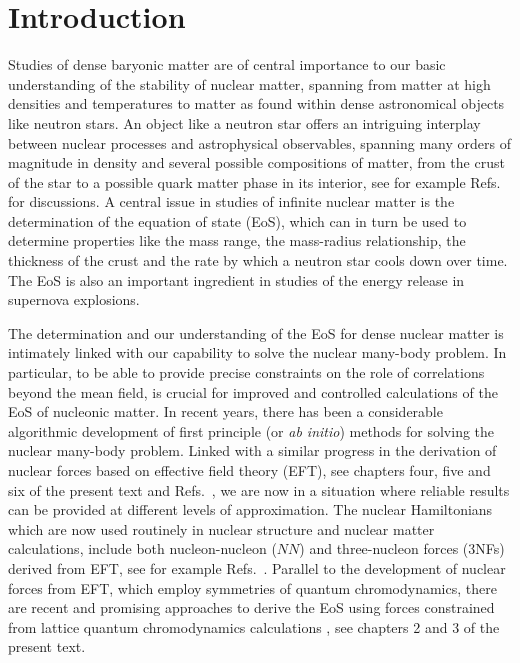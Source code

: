 \section{Introduction}\label{sec:chap8intro}


Studies of dense baryonic matter are of central importance to our
basic understanding of the stability of nuclear matter, spanning from
matter at high densities and temperatures to matter as found within
dense astronomical objects like neutron stars.  An object like a
neutron star offers an intriguing interplay between nuclear processes
and astrophysical observables, spanning many orders of magnitude in
density and several possible compositions of matter, from the crust of
the star to a possible quark matter phase in its interior, see for
example Refs.~\cite{shapiro,prakash2001,Lattimer2007,steiner2010,steiner2012,lattimer2012,weber1999,hh2000}
for discussions.  A central issue in studies of infinite nuclear
matter is the determination of the equation of state (EoS), which can
in turn be used to determine properties like the mass range, the
mass-radius relationship, the thickness of the crust and the rate by
which a neutron star cools down over time. The EoS is also an
important ingredient in studies of the energy release in supernova
explosions.

The determination and our understanding of the EoS for dense nuclear
matter is intimately linked with our capability to solve the nuclear
many-body problem. In particular, to be able to provide precise
constraints on the role of correlations beyond the mean field, is
crucial for improved and controlled calculations of the EoS of
nucleonic matter.  In recent years, there has been a considerable
algorithmic development of first principle (or {\em ab initio})
methods for solving the nuclear many-body problem. Linked with a
similar progress in the derivation of nuclear forces based on
effective field theory (EFT), see chapters four, five and six of the
present text and Refs.~\cite{Weinberg:1990rz,Weinberg:1991um,Ordonez:1992xp,Ordonez:1993tn,vanKolck:1994yi,vankolck1999,machleidt2011,epelbaum2009},
we are now in a situation where reliable results can be provided at
different levels of approximation.  The nuclear Hamiltonians which are
now used routinely in nuclear structure and nuclear matter
calculations, include both nucleon-nucleon ($NN$) and three-nucleon forces (3NFs) derived from EFT, see for
example
Refs.~\cite{Hagen:2015yea,Ekstrom:2015rta,hagen2016,coraggio2014,sammarruca2015,roth2012,binder2013,hergert2016,navratil2016,steiner2012,carbone2013,steiner2012}.
Parallel to the development of nuclear forces from EFT, which employ
symmetries of quantum chromodynamics, there are recent and promising
approaches to derive the EoS using forces constrained from lattice
quantum chromodynamics calculations \cite{tetsuo2013}, see chapters 2
and 3 of the present text.

